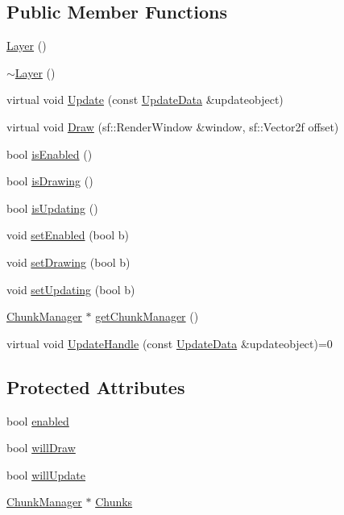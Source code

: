 \subsection*{Public Member Functions}
\begin{DoxyCompactItemize}
\item 
\hyperlink{class_layer_a8f623c7c4737dc29ecc86978d243ac6f}{Layer} ()
\item 
\hyperlink{class_layer_a1b1ba4804451dfe6cc357194e42762ae}{$\sim$\-Layer} ()
\item 
virtual void \hyperlink{class_layer_a971c3f8d301e250aded4cf0c0b9ad544}{Update} (const \hyperlink{class_update_data}{Update\-Data} \&updateobject)
\item 
virtual void \hyperlink{class_layer_a008068a5a6bd4dd274bb01bf0246cfaf}{Draw} (sf\-::\-Render\-Window \&window, sf\-::\-Vector2f offset)
\item 
bool \hyperlink{class_layer_a57c59677e3c56a7fd5e3dc985bdb9b4c}{is\-Enabled} ()
\item 
bool \hyperlink{class_layer_a46a91415e6bdc2fdb75ae0ac8498868f}{is\-Drawing} ()
\item 
bool \hyperlink{class_layer_ac2892b95b2df74446d89e4a6388f0c88}{is\-Updating} ()
\item 
void \hyperlink{class_layer_a68b9de1ac0f3eaa8274b8d0a901a825c}{set\-Enabled} (bool b)
\item 
void \hyperlink{class_layer_a0a4f62b4c031e7c2f2d5635ccd38ddd1}{set\-Drawing} (bool b)
\item 
void \hyperlink{class_layer_a0e0595efe93dbd63b05339f35399d1ad}{set\-Updating} (bool b)
\item 
\hyperlink{class_chunk_manager}{Chunk\-Manager} $\ast$ \hyperlink{class_layer_afbfd549c4d1da2e4a2d78a33586c95e1}{get\-Chunk\-Manager} ()
\item 
virtual void \hyperlink{class_layer_a1e7a6db5ee252c8ea9c44a21aaf2b0c9}{Update\-Handle} (const \hyperlink{class_update_data}{Update\-Data} \&updateobject)=0
\end{DoxyCompactItemize}
\subsection*{Protected Attributes}
\begin{DoxyCompactItemize}
\item 
bool \hyperlink{class_layer_af9f9c9a8c4a053bd829a06273df297bd}{enabled}
\item 
bool \hyperlink{class_layer_a64902a81921ba2fc792d044392b14ecc}{will\-Draw}
\item 
bool \hyperlink{class_layer_a8c3badeb437135a265c931f4ee728a48}{will\-Update}
\item 
\hyperlink{class_chunk_manager}{Chunk\-Manager} $\ast$ \hyperlink{class_layer_ab5408f6d27ad51d73df507296f16c811}{Chunks}
\end{DoxyCompactItemize}


